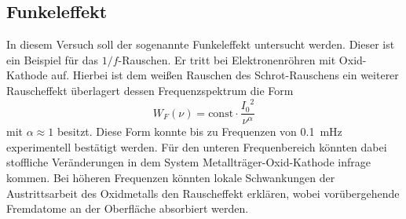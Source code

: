 
\subsection{Funkeleffekt}
\label{sub:funkeleffekt}

In diesem Versuch soll der sogenannte Funkeleffekt untersucht werden.
Dieser ist ein Beispiel für das $1/f$-Rauschen.
Er tritt bei Elektronenröhren mit Oxid-Kathode auf. Hierbei ist dem weißen
Rauschen des Schrot-Rauschens ein weiterer Rauscheffekt überlagert dessen
Frequenzspektrum die Form
\begin{equation}
  W_F(\nu) = \text{const} \cdot \frac{{I_0}^2}{\nu^\alpha}
\end{equation}
mit $\alpha \approx 1$ besitzt.
Diese Form konnte bis zu Frequenzen von \SI{0.1}{\milli\hertz} experimentell
bestätigt werden.
Für den unteren Frequenbereich könnten dabei stoffliche Veränderungen in dem
System Metallträger-Oxid-Kathode infrage kommen.
Bei höheren Frequenzen könnten lokale Schwankungen der Austrittsarbeit des
Oxidmetalls den Rauscheffekt erklären, wobei vorübergehende Fremdatome an der
Oberfläche absorbiert werden.
